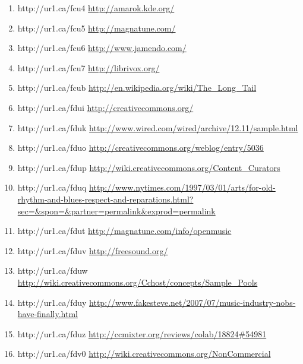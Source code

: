 \begin{enumerate}
    \item{http://ur1.ca/fcu4}
        \url{http://amarok.kde.org/}

    \item{http://ur1.ca/fcu5}
        \url{http://magnatune.com/}

    \item{http://ur1.ca/fcu6}
        \url{http://www.jamendo.com/}

    \item{http://ur1.ca/fcu7}
        \url{http://librivox.org/}

    \item{http://ur1.ca/fcub}
        \url{http://en.wikipedia.org/wiki/The\_Long\_Tail}

    \item{http://ur1.ca/fdui}
        \url{http://creativecommons.org/}

    \item{http://ur1.ca/fduk}
        \url{http://www.wired.com/wired/archive/12.11/sample.html}

    \item{http://ur1.ca/fduo}
        \url{http://creativecommons.org/weblog/entry/5036}

    \item{http://ur1.ca/fdup}
        \url{http://wiki.creativecommons.org/Content\_Curators}

    \item{http://ur1.ca/fduq}
        \url{http://www.nytimes.com/1997/03/01/arts/for-old-rhythm-and-blues-respect-and-reparations.html?sec=&spon=&partner=permalink&exprod=permalink}

    \item{http://ur1.ca/fdut}
        \url{http://magnatune.com/info/openmusic}

    \item{http://ur1.ca/fduv}
        \url{http://freesound.org/}

    \item{http://ur1.ca/fduw}
        \url{http://wiki.creativecommons.org/Cchost/concepts/Sample\_Pools}

    \item{http://ur1.ca/fduy}
        \url{http://www.fakesteve.net/2007/07/music-industry-nobs-have-finally.html}

    \item{http://ur1.ca/fduz}
        \url{http://ccmixter.org/reviews/colab/18824#54981}

    \item{http://ur1.ca/fdv0}
        \url{http://wiki.creativecommons.org/NonCommercial}


\end{enumerate}

